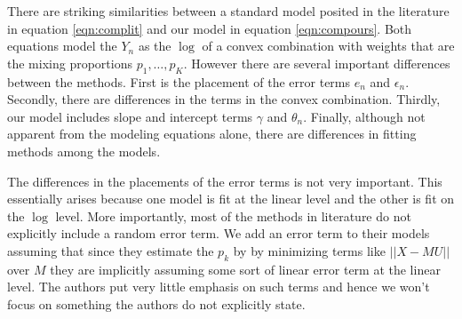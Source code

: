 \documentclass[reqno,12pt,oneside]{report}\usepackage[]{graphicx}\usepackage[]{color}
\theoremstyle{plain}
\theoremstyle{definition}
\theoremstyle{remark}
\numberwithin{theorem}{chapter}     %
\begin{document}
There are striking similarities between a standard model posited in the literature in equation \ref{eqn:complit} and our model in equation \ref{eqn:compours}. Both equations model the $Y_n$ as the $\log$ of a convex combination with weights that are the mixing proportions $p_1,\ldots,p_K$. However there are several important differences between the methods. First is the placement of the error terms $e_n$ and $\epsilon_n$. Secondly, there are differences in the terms in the convex combination. Thirdly, our model includes slope and intercept terms $\gamma$ and $\theta_n$. Finally, although not apparent from the modeling equations alone, there are differences in fitting methods among the models. 

The differences in the placements of the error terms is not very important. This essentially arises because one model is fit at the linear level and the other is fit on the $\log$ level. More importantly, most of the methods in literature do not explicitly include a random error term. We add an error term to their models assuming that since they estimate the $p_k$ by by minimizing terms like $||X-MU||$ over $M$ they are implicitly assuming some sort of linear error term at the linear level. The authors put very little emphasis on such terms and hence we won't focus on something the authors do not explicitly state.
\end{document}
